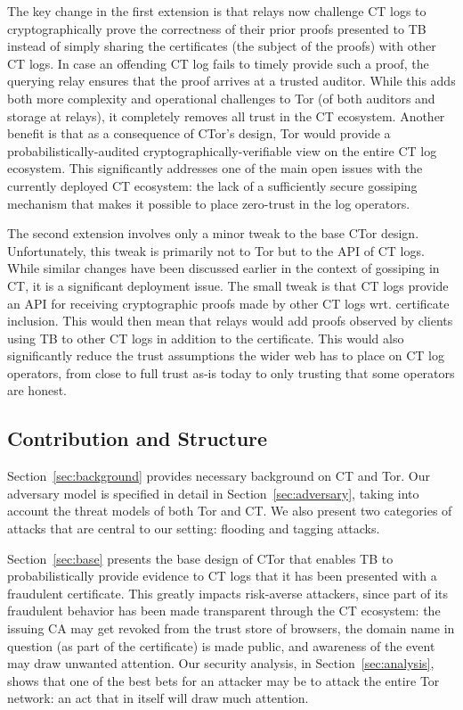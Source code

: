 The key change in the first extension is that relays now challenge CT logs to
cryptographically prove the correctness of their prior proofs presented to TB
instead of simply sharing the certificates (the subject of the proofs) with
other CT logs. In case an offending CT log fails to timely provide such a proof,
the querying relay ensures that the proof arrives at a trusted auditor. While
this adds both more complexity and operational challenges to Tor (of both
auditors and storage at relays), it completely removes all trust in the CT
ecosystem. Another benefit is that as a consequence of CTor's design, Tor would
provide a probabilistically-audited cryptographically-verifiable view on the
entire CT log ecosystem. This significantly addresses one of the main open
issues with the currently deployed CT ecosystem: the lack of a sufficiently
secure gossiping mechanism that makes it possible to place zero-trust in the log
operators.

The second extension involves only a minor tweak to the base CTor design.
Unfortunately, this tweak is primarily not to Tor but to the API of CT logs.
While similar changes have been discussed earlier in the context of gossiping in
CT, it is a significant deployment issue. The small tweak is that CT logs
provide an API for receiving cryptographic proofs made by other CT logs wrt.
certificate inclusion. This would then mean that relays would add proofs
observed by clients using TB to other CT logs in addition to the certificate.
This would also significantly reduce the trust assumptions the wider web has to
place on CT log operators, from close to full trust as-is today to only trusting
that some operators are honest.

\subsection{Contribution and Structure}
Section~\ref{sec:background} provides necessary background on CT and Tor. Our
adversary model is specified in detail in Section~\ref{sec:adversary}, taking
into account the threat models of both Tor and CT. We also present two
categories of attacks that are central to our setting: flooding and tagging
attacks.

Section~\ref{sec:base} presents the base design of CTor that enables TB to
probabilistically provide evidence to CT logs that it has been presented with a
fraudulent certificate. This greatly impacts risk-averse attackers, since part
of its fraudulent behavior has been made transparent through the CT ecosystem:
the issuing CA may get revoked from the trust store of browsers, the domain name
in question (as part of the certificate) is made public, and awareness of the
event may draw unwanted attention. Our security analysis, in
Section~\ref{sec:analysis}, shows that one of the best bets for an attacker may
be to attack the entire Tor network: an act that in itself will draw much
attention.

